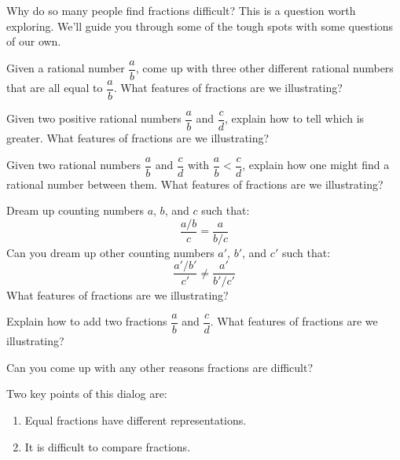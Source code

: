 Why do so many people find fractions difficult? This is a question
worth exploring. We'll guide you through some of the tough spots with
some questions of our own.

\begin{question}
Given a rational number $\dfrac{a}{b}$, come up with three other different rational numbers
that are all equal to $\dfrac{a}{b}$. What features of fractions are we
illustrating?
\end{question}
\QM

\begin{question}
Given two positive rational numbers $\dfrac{a}{b}$ and $\dfrac{c}{d}$, explain how to tell which is greater. What features of fractions are we illustrating?
\end{question}
\QM

\begin{question} 
Given two rational numbers $\dfrac{a}{b}$ and $\dfrac{c}{d}$ with $\dfrac{a}{b} < \dfrac{c}{d}$, explain how one
might find a rational number between them. What features of fractions are we
illustrating?
\end{question}
\QM


\begin{question} 
Dream up counting numbers $a$, $b$, and $c$ such that:
\[
\frac{a/b}{c} = \frac{a}{b/c}
\]
Can you dream up other counting numbers $a'$, $b'$, and $c'$ such that:
\[
\frac{a'/b'}{c'} \neq \frac{a'}{b'/c'}
\]
What features of fractions are we illustrating?
\end{question}
\QM

\begin{question}
Explain how to add two fractions $\dfrac{a}{b}$ and $\dfrac{c}{d}$. What features of
fractions are we illustrating?
\end{question}
\QM


\begin{question} 
Can you come up with any other reasons fractions are difficult?
\end{question}
\QM

\begin{teachingnote}
Two key points of this dialog are: 
\begin{enumerate}
\item Equal fractions have different representations. 
\item It is difficult to compare fractions. 
\end{enumerate}
\end{teachingnote}






